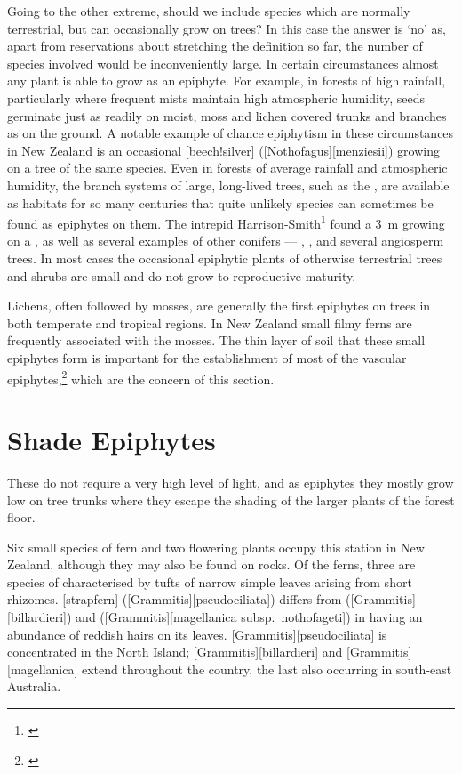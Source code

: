 Going to the other extreme, should we include species which are normally terrestrial, but can occasionally grow on trees? In this case the answer is `no' as, apart from reservations about stretching the definition so far, the number of species involved would be inconveniently large.
In certain circumstances almost any plant is able to grow as an epiphyte.
For example, in forests of high rainfall, particularly where frequent mists maintain high atmospheric humidity, seeds germinate just as readily on moist, moss and lichen covered trunks and branches as on the ground.
A notable example of chance epiphytism in these circumstances in New Zealand is an occasional [beech!silver] ([Nothofagus][menziesii]) growing on a tree of the same species.
Even in forests of average rainfall and atmospheric humidity, the branch systems of large, long-lived trees, such as the , are available as habitats for so many centuries that quite unlikely species can sometimes be found as epiphytes on them.
The intrepid Harrison-Smith\footnote{\cite{harrisonsmith1938kauri}} found a \SI{3}{\metre}  growing on a , as well as several examples of other conifers --- , ,  and several angiosperm trees.
In most cases the occasional epiphytic plants of otherwise terrestrial trees and shrubs are small and do not grow to reproductive maturity.

Lichens, often followed by mosses, are generally the first epiphytes on trees in both temperate and tropical regions.
In New Zealand small filmy ferns are frequently associated with the mosses.
The thin layer of soil that these small epiphytes form is important for the establishment of most of the vascular epiphytes,\footnote{\cite{oliver1930new}} which are the concern of this section.

\section{Shade Epiphytes}

These do not require a very high level of light, and as epiphytes they mostly grow low on tree trunks where they escape the shading of the larger plants of the forest floor.

Six small species of fern and two flowering plants occupy this station in New Zealand, although they may also be found on rocks.
Of the ferns, three are species of  characterised by tufts of narrow simple leaves arising from short rhizomes. [strapfern] ([Grammitis][pseudociliata]) differs from  ([Grammitis][billardieri]) and  ([Grammitis][magellanica subsp.\ nothofageti]) in having an abundance of reddish hairs on its leaves.
[Grammitis][pseudociliata] is concentrated in the North Island; [Grammitis][billardieri] and [Grammitis][magellanica] extend throughout the country, the last also occurring in south-east Australia.

